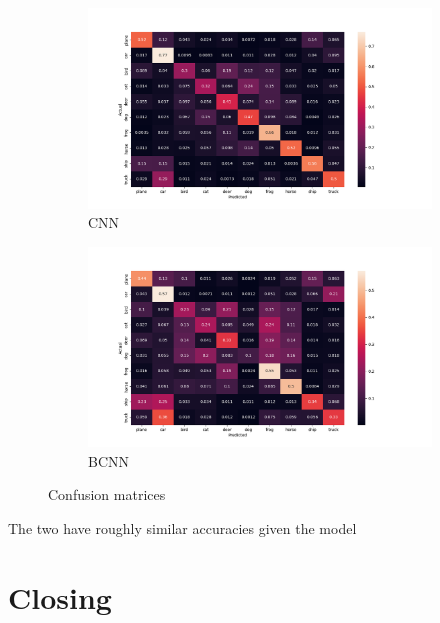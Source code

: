 \documentclass[12pt]{article}
\begin{document}
\begin{figure}[H]
	\centering
	\begin{subfigure}{.5\textwidth}
		\centering
		\includegraphics[width=.9\linewidth]{../Images/CNN_confusion_matrix}
		\caption{CNN}
	\end{subfigure}%
	\begin{subfigure}{.5\textwidth}
		\centering
		\includegraphics[width=.9\linewidth]{../Images/BNN_confusion_matrix}
		\caption{BCNN}
	\end{subfigure}
	\caption{Confusion matrices}
\end{figure}

The two have roughly similar accuracies given the model 

\section{Closing}



\newpage

\printbibliography
\end{document}
